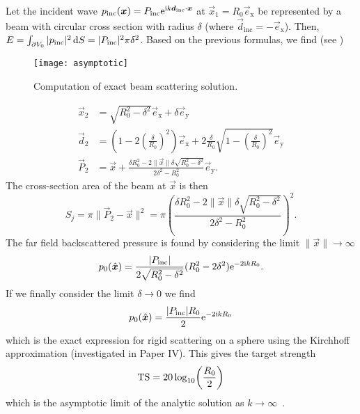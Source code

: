Let the incident wave $p_{\mathrm{inc}}(\vec{x}) = P_{\mathrm{inc}}\euler^{\imag k \vec{d}_{\mathrm{inc}}\cdot\vec{x}}$ at $\vec{x}_1 = R_0\vec{e}_{\mathrm{x}}$ be represented by a beam with circular cross section with radius $\delta$ (where $\vec{d}_{\mathrm{inc}}=-\vec{e}_{\mathrm{x}}$).
Then, $E = \int_{\partial V_0} |p_{\mathrm{inc}}|^2\, \mathrm{d} S = |P_{\mathrm{inc}}|^2\pi\delta^2$.
Based on the previous formulas, we find (see )
\begin{figure}
	\centering
	\texttt{[image: asymptotic]}
	\caption{Computation of exact beam scattering solution.}
	\label{Fig:asymptotic}
\end{figure}%
\begin{align*}
	\vec{x}_2 &= \sqrt{R_0^2-\delta^2}\vec{e}_{\mathrm{x}}+\delta\vec{e}_{\mathrm{y}}\\
	\vec{d}_2 &= \left(1-2\left(\frac{\delta}{R_0}\right)^2\right)\vec{e}_{\mathrm{x}}+2\frac{\delta}{R_0}\sqrt{1-\left(\frac{\delta}{R_0}\right)^2}\vec{e}_{\mathrm{y}}\\
	\vec{P}_2 &= \vec{x} + \frac{\delta R_0^2-2\|\vec{x}\|\delta\sqrt{R_0^2-\delta^2}}{2\delta^2-R_0^2}\vec{e}_{\mathrm{y}}.
\end{align*}
The cross-section area of the beam at $\vec{x}$ is then
\begin{equation*}
	S_j = \pi\|\vec{P}_2-\vec{x}\|^2 = \pi\left(\frac{\delta R_0^2-2\|\vec{x}\|\delta\sqrt{R_0^2-\delta^2}}{2\delta^2-R_0^2}\right)^2.
\end{equation*}
The far field backscattered pressure is found by considering the limit $\|\vec{x}\|\to\infty$
\begin{equation*}
	p_0(\hat{\vec{x}}) = \frac{|P_{\mathrm{inc}}|}{2\sqrt{R_0^2-\delta^2}}(R_0^2-2\delta^2)\euler^{-2\imag k R_0}.
\end{equation*}
If we finally consider the limit $\delta\to 0$ we find
\begin{equation*}
	p_0(\hat{\vec{x}}) = \frac{|P_{\mathrm{inc}}|R_0}{2}\euler^{-2\imag k R_0}
\end{equation*}
which is the exact expression for rigid scattering on a sphere using the Kirchhoff approximation (investigated in Paper IV). This gives the target strength
\begin{equation*}
	\TS = 20\log_{10}\left(\frac{R_0}{2}\right)
\end{equation*}
which is the asymptotic limit of the analytic solution as $k\to\infty$~\cite{Fillinger2014aen}.

